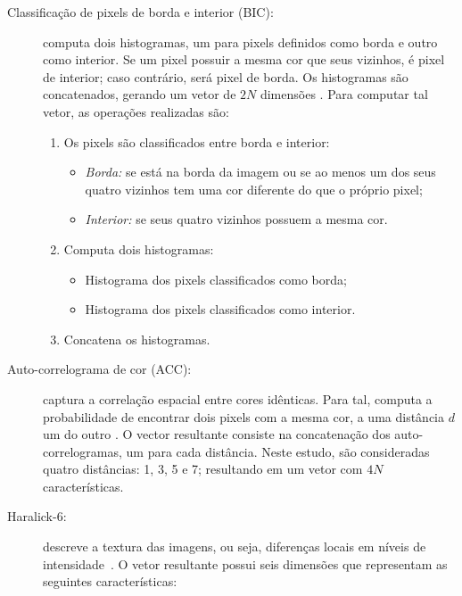 \begin{description}
\item[Classificação de pixels de borda e interior (BIC):] computa dois histogramas, um para pixels definidos como borda e outro como interior. Se um pixel possuir a mesma cor que seus vizinhos, é pixel de interior; caso contrário, será pixel de borda. Os histogramas são concatenados, gerando um vetor de $2N$ dimensões \cite{bic}. Para computar tal vetor, as operações realizadas são:

\begin{enumerate}
  \item Os pixels são classificados entre borda e interior:
  \begin{itemize}
    \item \emph{Borda:} se está na borda da imagem ou se ao menos um dos seus quatro vizinhos tem uma cor diferente do que o próprio pixel;
    \item \emph{Interior:} se seus quatro vizinhos possuem a mesma cor.
  \end{itemize}
  \item Computa dois histogramas:
  \begin{itemize}
    \item Histograma dos pixels classificados como borda;
    \item Histograma dos pixels classificados como interior.
  \end{itemize}
  \item Concatena os histogramas.
\end{enumerate}

\item[Auto-correlograma de cor (ACC):] captura a correlação espacial entre cores idênticas. Para tal, computa a probabilidade de encontrar dois pixels com a mesma cor, a uma distância $d$ um do outro \cite{acc}. O vector resultante consiste na concatenação dos auto-correlogramas, um para cada distância. Neste estudo, são consideradas quatro distâncias: 1, 3, 5 e 7; resultando em um vetor com $4N$ características.

\item[Haralick-6:] descreve a textura das imagens, ou seja, diferenças locais em níveis de intensidade~\cite{Haralick1973}. O vetor resultante possui seis dimensões que representam as seguintes características:


\end{description}
